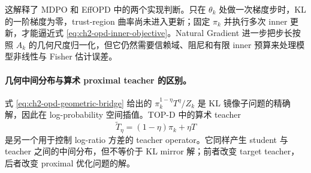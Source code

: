 这解释了 MDPO 和 EffOPD 中的两个实现判断。只在 $\theta_k$ 处做一次梯度步时，KL 的一阶梯度为零，trust-region 曲率尚未进入更新；固定 $\pi_k$ 并执行多次 inner 更新，才能逼近式 \eqref{eq:ch2-opd-inner-objective}。Natural Gradient 进一步把步长按照 $A_k$ 的几何尺度归一化，但它仍然需要信赖域、阻尼和有限 inner 预算来处理模型非线性与 Fisher 估计误差。


\paragraph{几何中间分布与算术 proximal teacher 的区别。} 式 \eqref{eq:ch2-opd-geometric-bridge} 给出的 $\pi_k^{1-\eta}T^\eta/Z_k$ 是 KL 镜像子问题的精确解，因此在 log-probability 空间插值。TOP-D 中的算术 teacher
\[
\widetilde T_\eta=(1-\eta)\pi_k+\eta T
\]
是另一个用于控制 log-ratio 方差的 teacher operator。它同样产生 student 与 teacher 之间的中间分布，但不等价于 KL mirror 解；前者改变 target teacher，后者改变 proximal 优化问题的解。
